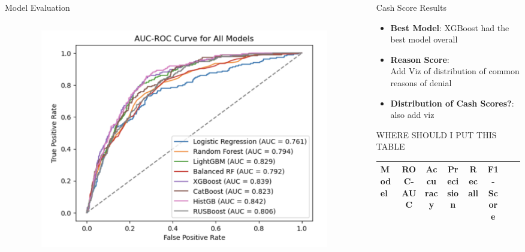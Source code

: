 \documentclass[final]{beamer}
\newlength{\sepwidth}
\newlength{\colwidth}
\newcommand{\separatorcolumn}{\begin{column}{\sepwidth}\end{column}}
\begin{document}
\begin{frame}[t]
\begin{columns}[t]
\begin{column}{\colwidth}
\begin{block}{Model Evaluation}
\begin{columns}
\begin{column}{0.5\textwidth}
\end{column}
\begin{column}{0.5\textwidth}
\begin{center}
      \begin{figure}[H]
        \includegraphics[height=0.2\textheight]{figure/auc_roc_all_models.png}
        \label{fig:accounts_df}
    \end{figure}
\end{center}
\end{column}
\end{columns}
  \end{block}
\end{column}

\separatorcolumn

\begin{column}{\colwidth}

  \begin{exampleblock}{Cash Score Results}
  \begin{itemize}
        \item \textbf{Best Model}: XGBoost had the best model overall
        \item \textbf{Reason Score}: \\
        Add Viz of distribution of common reasons of denial
        \item \textbf{Distribution of Cash Scores?}: \\
        also add viz
    \end{itemize}

    WHERE SHOULD I PUT THIS TABLE
    \begin{table}[H]
    \centering
    \begin{tabular}{|l|c|c|c|c|c|c|c|}
        \hline
        Model & ROC-AUC & Accuracy & Precision & Recall & F1-Score \\
        \hline


\end{tabular}
\end{table}
\end{exampleblock}
\end{column}
\end{columns}
\end{frame}
\end{document}
